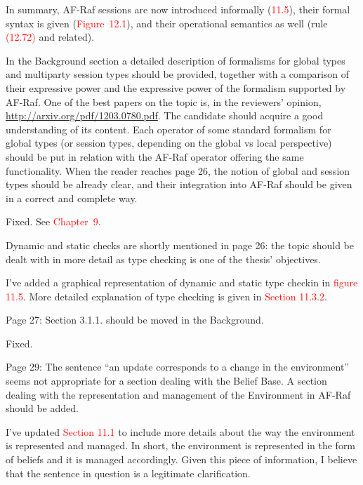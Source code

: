 \documentclass{article}
\newcommand*\R[1]{\textcolor{red}{#1}} %
\newenvironment{them}{\noindent\begingroup\color{blue}}{\endgroup\par}
\begin{document}
In summary,
  AF-Raf sessions are now introduced informally (\R{11.5}),
  their formal syntax is given (\R{Figure~12.1}),
  and their operational semantics as well (rule \R{(12.72)} and related).


\begin{them}

In the Background section a detailed description of formalisms for global types
and multiparty session types should be provided, together with a comparison of
their expressive power and the expressive power of the formalism supported by
AF-Raf. One of the best papers on the topic is, in the reviewers' opinion,
\url{http://arxiv.org/pdf/1203.0780.pdf}. The candidate should acquire a good
understanding of its content. Each operator of some standard formalism for
global types (or session types, depending on the global vs local perspective)
should be put in relation with the AF-Raf operator offering the same
functionality. When the reader reaches page 26, the notion of global and
session types should be already clear, and their integration into AF-Raf should
be given in a correct and complete way.

\end{them}
Fixed. See \R{Chapter~9}.

\begin{them}

Dynamic and static checks are shortly mentioned in page 26: the topic should be
dealt with in more detail as type checking is one of the thesis' objectives.

\end{them}
I've added a graphical representation of dynamic and static type checkin in \R{figure 11.5}. More detailed explanation of type checking is given in \R{Section 11.3.2}.

\begin{them}

Page 27:
Section 3.1.1. should be moved in the Background.
\end{them}
Fixed. 

\begin{them}

Page 29:
The sentence “an update corresponds to a change in the environment” seems not
appropriate for a section dealing with the Belief Base. A section dealing with
the representation and management of the Environment in AF-Raf should be added.

\end{them}
I've updated \R{Section 11.1} to include more details about the way the
environment is represented and managed. In short, the environment is
represented in the form of beliefs and it is managed accordingly. Given this
piece of information, I believe that the sentence in question is a legitimate
clarification.
\end{document}
